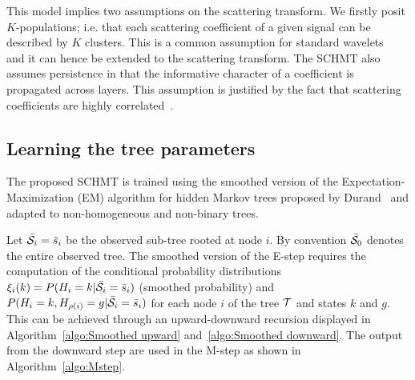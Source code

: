 \documentclass{article}
\begin{document}
    This model implies two assumptions on the scattering transform.  We firstly posit $K$-populations; i.e. that each scattering coefficient of a given signal can be described by $K$ clusters. This is a common assumption for standard wavelets~\cite{kingsbury2001complex} and it can hence be extended to the scattering transform. The SCHMT also assumes persistence in that the informative character of a
    coefficient is propagated across layers. This assumption is justified by the fact that scattering coefficients are highly correlated~\cite{oyallon2014deep}.
  
  \vspace{-5pt}
  \subsection{Learning the tree parameters}
    \label{subsec:SCHMT/Learning}    
    \vspace{-5pt}
    The proposed SCHMT is trained using the smoothed version of the Expectation-Maximization (EM) algorithm for hidden Markov trees proposed by Durand~\cite{durand2001statistical} and adapted to non-homogeneous and non-binary trees.
    
    Let $\bar{\mathcal{S}}_{i}= \bar{s}_{i}$ be the observed sub-tree rooted at node $i$. By convention $\bar{\mathcal{S}}_{0}$ denotes the entire observed tree. The smoothed version of the E-step requires the computation of the conditional probability distributions $\xi_{i}(k) = P(H_{i}=k | \bar{\mathcal{S}}_{i}= \bar{s}_{i})$ (smoothed probability) and $P(H_{i}=k, H_{\rho(i)}=g | \bar{\mathcal{S}}_{i}= \bar{s}_{i})$ for each node $i$ of the tree $\mathcal{T}$ and states $k$ and $g$. This can be achieved through an upward-downward recursion displayed in Algorithm~\ref{algo:Smoothed upward} and~\ref{algo:Smoothed downward}. The output from the downward step are used in the M-step as shown in Algorithm~\ref{algo:Mstep}.
    
\end{document}
